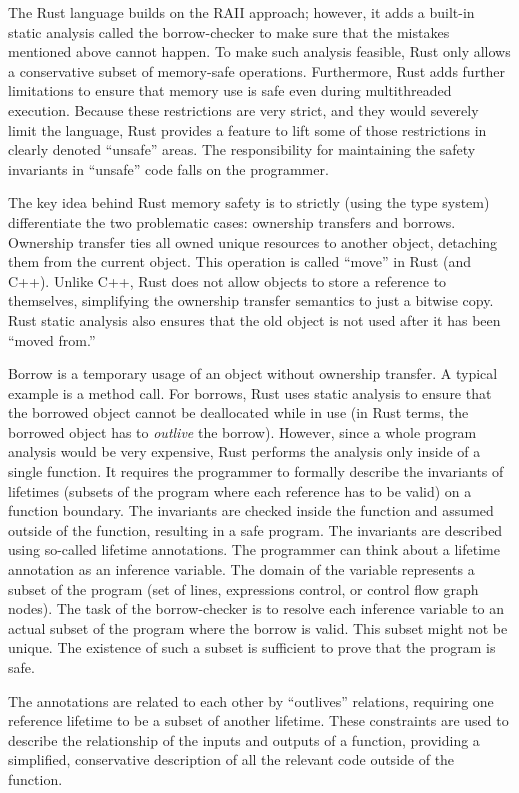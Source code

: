 \documentclass[
  11pt,
]{report}
\begin{document}
The Rust language builds on the RAII approach; however, it adds a
built-in static analysis called the borrow-checker to make sure that the
mistakes mentioned above cannot happen. To make such analysis feasible,
Rust only allows a conservative subset of memory-safe operations.
Furthermore, Rust adds further limitations to ensure that memory use is
safe even during multithreaded execution. Because these restrictions are
very strict, and they would severely limit the language, Rust provides a
feature to lift some of those restrictions in clearly denoted ``unsafe''
areas. The responsibility for maintaining the safety invariants in
``unsafe'' code falls on the programmer.

The key idea behind Rust memory safety is to strictly (using the type
system) differentiate the two problematic cases: ownership transfers and
borrows. Ownership transfer ties all owned unique resources to another
object, detaching them from the current object. This operation is called
``move'' in Rust (and C++). Unlike C++, Rust does not allow objects to
store a reference to themselves, simplifying the ownership transfer
semantics to just a bitwise copy. Rust static analysis also ensures that
the old object is not used after it has been ``moved from.''

Borrow is a temporary usage of an object without ownership transfer. A
typical example is a method call. For borrows, Rust uses static analysis
to ensure that the borrowed object cannot be deallocated while in use
(in Rust terms, the borrowed object has to \emph{outlive} the borrow).
However, since a whole program analysis would be very expensive, Rust
performs the analysis only inside of a single function. It requires the
programmer to formally describe the invariants of lifetimes (subsets of
the program where each reference has to be valid) on a function
boundary. The invariants are checked inside the function and assumed
outside of the function, resulting in a safe program. The invariants are
described using so-called lifetime annotations. The programmer can think
about a lifetime annotation as an inference variable. The domain of the
variable represents a subset of the program (set of lines, expressions
control, or control flow graph nodes). The task of the borrow-checker is
to resolve each inference variable to an actual subset of the program
where the borrow is valid. This subset might not be unique. The
existence of such a subset is sufficient to prove that the program is
safe.

The annotations are related to each other by ``outlives'' relations,
requiring one reference lifetime to be a subset of another lifetime.
These constraints are used to describe the relationship of the inputs
and outputs of a function, providing a simplified, conservative
description of all the relevant code outside of the function.
\end{document}
